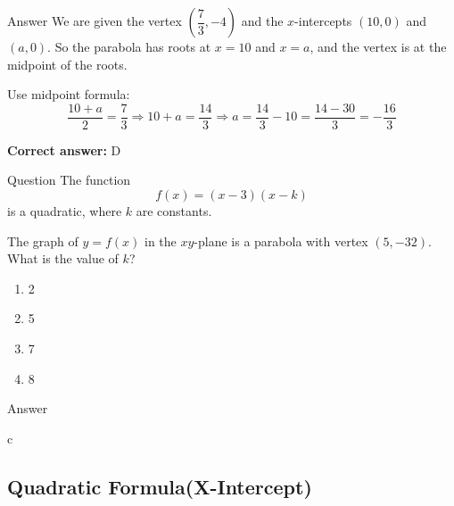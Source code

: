 \documentclass{beamer}
\begin{document}
\begin{frame}{Answer}
We are given the vertex $\left(\dfrac{7}{3}, -4\right)$ and the $x$-intercepts $(10, 0)$ and $(a, 0)$. So the parabola has roots at $x = 10$ and $x = a$, and the vertex is at the midpoint of the roots.

Use midpoint formula:
\[
\frac{10 + a}{2} = \frac{7}{3}
\Rightarrow 10 + a = \frac{14}{3}
\Rightarrow a = \frac{14}{3} - 10 = \frac{14 - 30}{3} = -\frac{16}{3}
\]

\textbf{Correct answer:} D
\end{frame}


\begin{frame}{Question}
The function 
\[
f(x) = (x - 3)(x - k)
\]
is a quadratic, where $k$ are constants.

The graph of $y = f(x)$ in the $xy$-plane is a parabola with vertex $(5, -32)$. What is the value of $k$?

\begin{enumerate}
  \item[A)] 2
  \item[B)] 5
  \item[C)] 7
  \item[D)] 8
\end{enumerate}
\end{frame}



\begin{frame}{Answer}

c

\end{frame}







\begin{frame}
\section{Quadratic Formula(X-Intercept)}
\end{frame}
\end{document}
